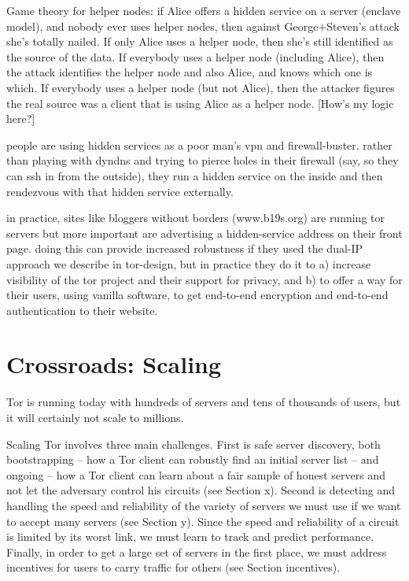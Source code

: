 \documentclass{llncs}
\begin{document}


Game theory for helper nodes: if Alice offers a hidden service on a
server (enclave model), and nobody ever uses helper nodes, then against
George+Steven's attack she's totally nailed. If only Alice uses a helper
node, then she's still identified as the source of the data. If everybody
uses a helper node (including Alice), then the attack identifies the
helper node and also Alice, and knows which one is which. If everybody
uses a helper node (but not Alice), then the attacker figures the real
source was a client that is using Alice as a helper node. [How's my
logic here?]

people are using hidden services as a poor man's vpn and firewall-buster.
rather than playing with dyndns and trying to pierce holes in their
firewall (say, so they can ssh in from the outside), they run a hidden
service on the inside and then rendezvous with that hidden service
externally.

in practice, sites like bloggers without borders (www.b19s.org) are
running tor servers but more important are advertising a hidden-service
address on their front page. doing this can provide increased robustness
if they used the dual-IP approach we describe in tor-design, but in
practice they do it to a) increase visibility of the tor project and their
support for privacy, and b) to offer a way for their users, using vanilla
software, to get end-to-end encryption and end-to-end authentication to
their website.


\section{Crossroads: Scaling}

Tor is running today with hundreds of servers and tens of thousands of
users, but it will certainly not scale to millions.

Scaling Tor involves three main challenges.  First is safe server
discovery, both bootstrapping -- how a Tor client can robustly find an
initial server list -- and ongoing -- how a Tor client can learn about
a fair sample of honest servers and not let the adversary control his
circuits (see Section x).  Second is detecting and handling the speed
and reliability of the variety of servers we must use if we want to
accept many servers (see Section y).
Since the speed and reliability of a circuit is limited by its worst link,
we must learn to track and predict performance.  Finally, in order to get
a large set of servers in the first place, we must address incentives
for users to carry traffic for others (see Section incentives).
\end{document}
